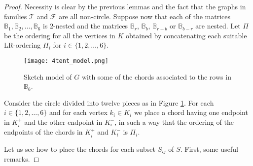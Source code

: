 \documentclass[12pt]{book}
\theoremstyle{plain}
\theoremstyle{remark}
\begin{document}
\begin{proof}

Necessity is clear by the previous lemmas and the fact that the graphs in families $\mathcal{T}$ and $\mathcal{F}$ are all non-circle. Suppose now that each of the matrices $\mathbb B_1,\mathbb B_2,\ldots,\mathbb B_6$ is $2$-nested and the matrices $\mathbb B_r$, $\mathbb B_b$, $\mathbb B_{r-b}$ or $\mathbb B_{b-r}$ are nested.
Let $\Pi$ be the ordering for all the vertices in $K$ obtained by concatenating each suitable LR-ordering $\Pi_i$ for $i \in \{1, 2,\ldots, 6\}$.

\begin{figure}[h!]
    \texttt{[image: 4tent\_model.png]}   
	\caption{Sketch model of $G$ with some of the chords associated to the rows in $\mathbb{B}_6$.}
     \label{fig:4tent_model} 
\end{figure}


Consider the circle divided into twelve pieces as in Figure \ref{fig:4tent_model}. For each $i\in\{1,2,\ldots,6\}$ and for each vertex $k_i \in K_i$ we place a chord having one endpoint in $K_i^+$ and the other endpoint in $K_i^-$, in such a way that the ordering of the endpoints of the chords in $K_i^+$ and $K_i^-$ is $\Pi_i$. 

Let us see how to place the chords for each subset $S_{ij}$ of $S$. First, some useful remarks.


\end{proof}
\end{document}
